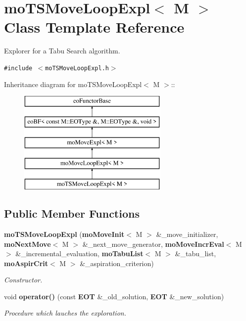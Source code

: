 \section{mo\-TSMove\-Loop\-Expl$<$ M $>$ Class Template Reference}
\label{classmo_t_s_move_loop_expl}
Explorer for a Tabu Search algorithm.  


{\tt \#include $<$mo\-TSMove\-Loop\-Expl.h$>$}

Inheritance diagram for mo\-TSMove\-Loop\-Expl$<$ M $>$::\begin{figure}[H]
\begin{center}
\leavevmode
\includegraphics[height=5cm]{classmo_t_s_move_loop_expl}
\end{center}
\end{figure}
\subsection*{Public Member Functions}
\begin{CompactItemize}
\item 
{\bf mo\-TSMove\-Loop\-Expl} ({\bf mo\-Move\-Init}$<$ M $>$ \&\_\-move\_\-initializer, {\bf mo\-Next\-Move}$<$ M $>$ \&\_\-next\_\-move\_\-generator, {\bf mo\-Move\-Incr\-Eval}$<$ M $>$ \&\_\-incremental\_\-evaluation, {\bf mo\-Tabu\-List}$<$ M $>$ \&\_\-tabu\_\-list, {\bf mo\-Aspir\-Crit}$<$ M $>$ \&\_\-aspiration\_\-criterion)
\begin{CompactList}\small\item\em Constructor. \item\end{CompactList}\item 
void {\bf operator()} (const {\bf EOT} \&\_\-old\_\-solution, {\bf EOT} \&\_\-new\_\-solution)
\begin{CompactList}\small\item\em Procedure which lauches the exploration. \item\end{CompactList}\end{CompactItemize}

